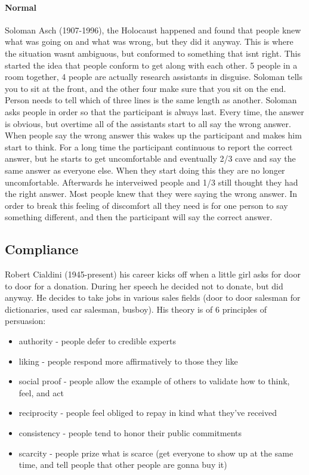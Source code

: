 \documentclass{article}
\begin{document}
\paragraph*{Normal} Soloman Asch (1907-1996), the Holocaust happened and found that people knew what was going on and what was wrong, but they did it anyway. This is where the situation wasnt ambiguous, but conformed to something that isnt right. This started the idea that people conform to get along with each other. 5 people in a room together, 4 people are actually research assistants in disguise. Soloman tells you to sit at the front, and the other four make sure that you sit on the end. Person needs to tell which of three lines is the same length as another. Soloman asks people in order so that the participant is always last. Every time, the answer is obvious, but overtime all of the assistants start to all say the wrong answer. When people say the wrong answer this wakes up the participant and makes him start to think. For a long time the participant continuous to report the correct answer, but he starts to get uncomfortable and eventually 2/3 cave and say the same answer as everyone else. When they start doing this they are no longer uncomfortable. Afterwards he interveiwed people and 1/3 still thought they had the right answer. Most people knew that they were saying the wrong answer. In order to break this feeling of discomfort all they need is for one person to say something different, and then the participant will say the correct answer.

\subsection*{Compliance} 
Robert Cialdini (1945-present) his career kicks off when a little girl asks for door to door for a donation. During her speech he decided not to donate, but did anyway. He decides to take jobs in various sales fields (door to door salesman for dictionaries, used car salesman, busboy). His theory is of 6 principles of persuasion:
\begin{itemize}
\item authority - people defer to credible experts
\item liking - people respond more affirmatively to those they like
\item social proof - people allow the example of others to validate how to think, feel, and act
\item reciprocity - people feel obliged to repay in kind what they've received
\item consistency - people tend to honor their public commitments
\item scarcity - people prize what is scarce (get everyone to show up at the same time, and tell people that other people are gonna buy it)
\end{itemize}
\end{document}
